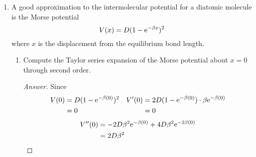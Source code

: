 \documentclass[../psets.tex]{subfiles}
\begin{document}
\begin{enumerate}
\begin{enumerate}
\begin{proof}[Answer]
\begin{align*}
                &= \frac{m-2m\sqrt{2}+2m}{m+2m\sqrt{2}+2m}\\
                &= \frac{3-2\sqrt{2}}{3+2\sqrt{2}}\\
                \Aboxed{R &= 17-12\sqrt{2}}
            \end{align*}
        \end{proof}
        \item Compare this result with the result from problem 5b of Problem Set 2.
        \begin{proof}[Answer]
            The answers are .
        \end{proof}
        \item From your result in (e), explain whether the degree of reflection depends on both the direction (step or "drop") \emph{and} magnitude of the potential change or only the magnitude of the change.
        \begin{proof}[Answer]
            Since the answer in part (e) matches that of a setup with the same magnitude but opposite direction, the degree of reflection depends , not the direction (step or drop).
        \end{proof}
    \end{enumerate}
    \item A good approximation to the intermolecular potential for a diatomic molecule is the Morse potential
    \begin{equation*}
        V(x) = D(1-\e[-\beta x])^2
    \end{equation*}
    where $x$ is the displacement from the equilibrium bond length.
    \begin{enumerate}
        \item Compute the Taylor series expansion of the Morse potential about $x=0$ through second order.
        \begin{proof}[Answer]
            Since
            \begin{align*}
                V(0) &= D(1-\e[-\beta(0)])^2&
                    V'(0) &= 2D(1-\e[-\beta(0)])\cdot\beta\e[-\beta(0)]\\
                &= 0&
                    &= 0
            \end{align*}
            \begin{align*}
                V''(0) &= -2D\beta^2\e[-\beta(0)]+4D\beta^2\e[-2\beta(0)]\\
                &= 2D\beta^2
            \end{align*}

\end{proof}
\end{enumerate}
\end{enumerate}
\end{document}
